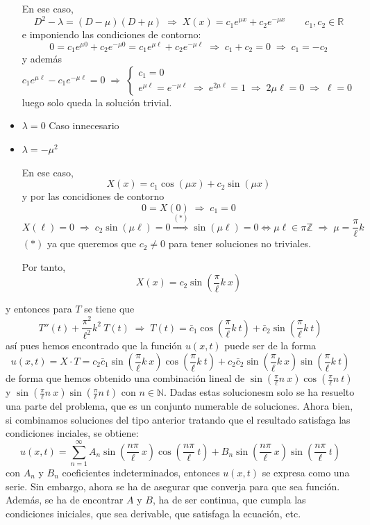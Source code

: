 \begin{eje}
\begin{itemize}
        En ese caso, 
        $$D^2-\lambda = (D-\mu)(D+\mu) \; \Rightarrow \; X(x)=c_1 e^{\mu x}+c_2 e^{- \mu x} \qquad c_1,c_2 \in \mathbb R$$
        e imponiendo las condiciones de contorno:
        $$0=c_1 e^{\mu 0}+c_2 e^{- \mu 0}=c_1 e^{\mu \ell}+c_2 e^{- \mu \ell} \; \Rightarrow \; c_1+c_2=0\; \Rightarrow \; c_1=-c_2 $$
        y además
        $$c_1 e^{\mu \ell}-c_1 e^{- \mu \ell}=0 \; \Rightarrow \; \begin{cases}
            c_1=0 \\
            e^{\mu \ell}= e^{- \mu \ell} \; \Rightarrow \; e^{2\mu \ell}=1 \; \Rightarrow \; 2 \mu \ell = 0 \; \Rightarrow \; \ell=0
        \end{cases}$$
        luego solo queda la solución trivial.
        \item \underline{$\lambda=0$} Caso innecesario
        \item \underline{$\lambda=-\mu^2$}
        
         En ese caso,
        $$X(x)=c_1 \cos(\mu x) + c_2 \sin(\mu x)$$
        y por las concidiones de contorno
        $$0=X(0) \; \Rightarrow \; c_1=0$$
        $$ X(\ell)=0 \; \Rightarrow \; c_2 \sin (\mu \ell)=0 \overset{(*)}{\Longrightarrow} \sin(\mu \ell)=0 \iff \mu \ell \in \pi \mathbb Z \; \Rightarrow \; \mu=\dfrac{\pi}{\ell} k$$
        $(*)$ ya que queremos que $c_2 \neq 0$ para tener soluciones no triviales.

        Por tanto, 
        $$X(x)=c_2 \sin\left(\dfrac{\pi}{\ell} k \: x \right)$$
    \end{itemize}
    y entonces para $T$ se tiene que
    $$T''(t)+\dfrac{\pi^2}{\ell^2}k^2 \: T(t) \; \Rightarrow \; T(t)=\bar{c}_1 \cos\left(\dfrac{\pi}{\ell} k \: t \right)+\bar{c}_2 \sin\left(\dfrac{\pi}{\ell} k \: t \right)$$ 
    así pues hemos encontrado que la función $u(x,t)$ puede ser de la forma
    $$u(x,t)=X \cdot T= c_2 \bar{c}_1 \sin\left(\dfrac{\pi}{\ell} k \: x \right)\cos\left(\dfrac{\pi}{\ell} k \: t \right) + c_2 \bar{c}_2 \sin\left(\dfrac{\pi}{\ell} k \: x \right)\sin\left(\dfrac{\pi}{\ell} k \: t \right)$$
    de forma que hemos obtenido una combinación lineal de $\sin\left(\frac{\pi}{\ell} n \: x \right)\cos\left(\frac{\pi}{\ell} n \: t \right)$ y $\sin\left(\frac{\pi}{\ell} n \: x \right)\sin\left(\frac{\pi}{\ell} n \: t \right)$ con $n \in \mathbb N$. Dadas estas solucionesm solo se ha resuelto una parte del problema, que es un conjunto numerable de soluciones. Ahora bien, si combinamos soluciones del tipo anterior tratando que el resultado satisfaga las condiciones inciales, se obtiene:
    $$u(x,t)=\sum_{n=1}^{\infty} A_n \sin\left( \dfrac{n \pi}{\ell} \: x\right) \cos\left( \dfrac{n \pi}{\ell} \: t\right) + B_n \sin\left( \dfrac{n \pi}{\ell} \: x\right)\sin\left( \dfrac{n \pi}{\ell} \: t\right)$$
    con $A_n$ y $B_n$ coeficientes indeterminados, entonces $u(x,t)$ se expresa como una serie. Sin embargo, ahora se ha de asegurar que converja para que sea función. Además, se ha de encontrar $A$ y $B$, ha de ser continua, que cumpla las condiciones iniciales, que sea derivable, que satisfaga la ecuación, etc.
    

\end{eje}
